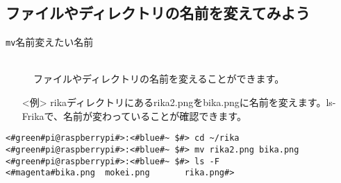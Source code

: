 \subsection{ファイルやディレクトリの名前を変えてみよう}
\begin{description}
\item[\texttt{mv}\textvisiblespace 名前\textvisiblespace 変えたい名前]\mbox{}\\
ファイルやディレクトリの名前を変えることができます。
\end{description}
\begin{itemize}
\item[<例>]rikaディレクトリにあるrika2.pngをbika.pngに名前を変えます。ls\textvisiblespace -F\textvisiblespace rikaで、名前が変わっていることが確認できます。
\end{itemize}
\begin{lstlisting}[caption=mvNameの例, label=mvName]
<#green#pi@raspberrypi#>:<#blue#~ $#> cd ~/rika
<#green#pi@raspberrypi#>:<#blue#~ $#> mv rika2.png bika.png
<#green#pi@raspberrypi#>:<#blue#~ $#> ls -F
<#magenta#bika.png	mokei.png		rika.png#>
\end{lstlisting}

\begin{tcolorbox}[title=\useOmetoi]
\begin{enumerate}
\end{enumerate}
\end{tcolorbox}
